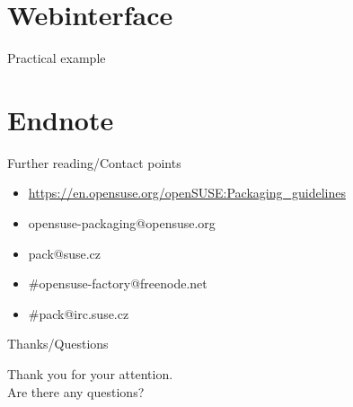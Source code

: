 \documentclass{beamer}
\begin{document}
\section{Webinterface}

\begin{frame}{Practical example}
\end{frame}

\section{Endnote}

\begin{frame}[t]{Further reading/Contact points}
	\begin{itemize}
	\item \url{https://en.opensuse.org/openSUSE:Packaging\_guidelines}
	\item opensuse-packaging@opensuse.org
	\item pack@suse.cz
	\item \#opensuse-factory@freenode.net 
	\item \#pack@irc.suse.cz
	\end{itemize}
\end{frame}

\begin{frame}{Thanks/Questions}
	\begin{center}
	Thank you for your attention.\\
	Are there any questions?
	\end{center}
\end{frame}
\end{document}
